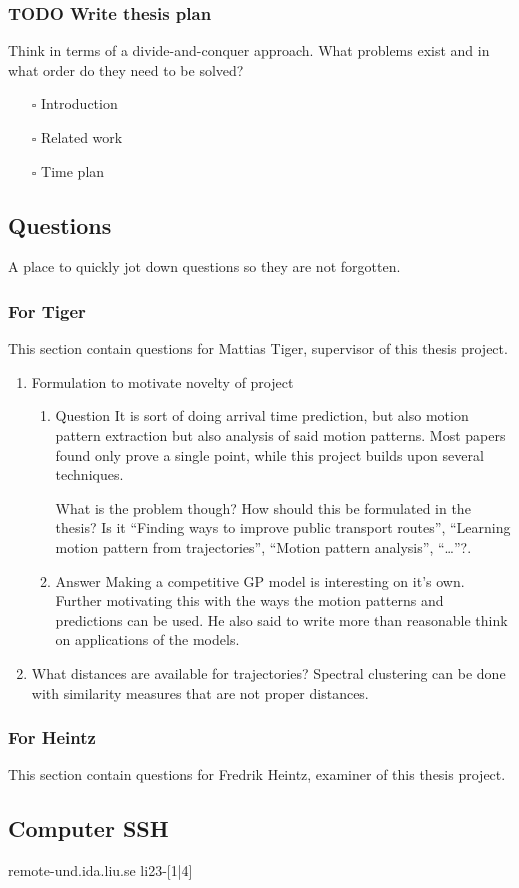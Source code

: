 \documentclass[11pt]{article}
\begin{document}
\subsubsection{{\bfseries\sffamily TODO} Write thesis plan}
\label{sec:org5321a22}
Think in terms of a divide-and-conquer approach. What problems
exist and in what order do they need to be solved?

\begin{itemize}
\item[{$\square$}] Introduction
\item[{$\square$}] Related work
\item[{$\square$}] Time plan
\end{itemize}

\subsection{Questions}
\label{sec:orgfe50123}
A place to quickly jot down questions so they are not forgotten.

\subsubsection{For Tiger}
\label{sec:org293258a}
\label{tiger-questions}
This section contain questions for Mattias Tiger, supervisor of
this thesis project.

\begin{enumerate}
\item Formulation to motivate novelty of project
\label{sec:org643388d}
\label{tiger-question-1}

\begin{enumerate}
\item Question
\label{sec:org00e0d79}
It is sort of doing arrival time prediction, but also motion pattern extraction but
also analysis of said motion patterns. Most papers found only
prove a single point, while this project builds upon several techniques.

What is the problem though? How should this be formulated in the
thesis? Is it ``Finding ways to improve public transport routes'', 
``Learning motion pattern from trajectories'', ``Motion
pattern analysis'', ``\ldots{}''?.

\item Answer
\label{sec:org2a03563}
Making a competitive GP model is interesting on it's
own. Further motivating this with the ways the motion patterns
and predictions can be used. He also said to write more than reasonable 
think on applications of the models.
\end{enumerate}


\item What distances are available for trajectories?
\label{sec:orgf83e3e8}
\label{tiger-question-3}
Spectral clustering can be done with similarity measures that are
not proper distances.
\end{enumerate}

\subsubsection{For Heintz}
\label{sec:org78a59d1}
This section contain questions for Fredrik Heintz, examiner of
this thesis project.

\subsection{Computer SSH}
\label{sec:org15a4215}
remote-und.ida.liu.se li23-[1|4]
\end{document}
